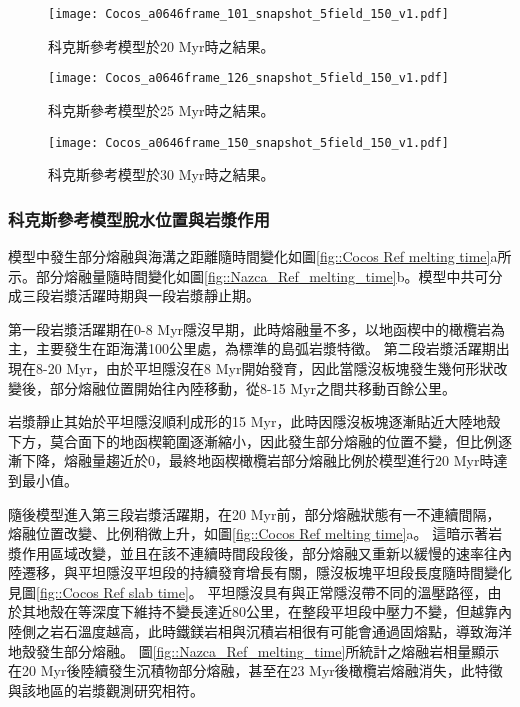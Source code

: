 \begin{figure*}[htp]
    \centering
    \texttt{[image: Cocos\_a0646frame\_101\_snapshot\_5field\_150\_v1.pdf]}
    \caption[科克斯參考模型於20 Myr時之結果]{科克斯參考模型於20 Myr時之結果。}
    \label{fig::Ref Cocos 101}
\end{figure*}

\begin{figure*}[htp]
    \centering
    \texttt{[image: Cocos\_a0646frame\_126\_snapshot\_5field\_150\_v1.pdf]}
    \caption[科克斯參考模型於25 Myr時之結果]{科克斯參考模型於25 Myr時之結果。}
    \label{fig::Ref Cocos 126}
\end{figure*}

\begin{figure*}[htp]
    \centering
    \texttt{[image: Cocos\_a0646frame\_150\_snapshot\_5field\_150\_v1.pdf]}
    \caption[科克斯參考模型於30 Myr時之結果]{科克斯參考模型於30 Myr時之結果。}
    \label{fig::Ref Cocos 150}
\end{figure*}

\newpage
\subsubsection{科克斯參考模型脫水位置與岩漿作用}
模型中發生部分熔融與海溝之距離隨時間變化如圖\ref{fig::Cocos Ref melting time}a所示。部分熔融量隨時間變化如圖\ref{fig::Nazca_Ref_melting_time}b。模型中共可分成三段岩漿活躍時期與一段岩漿靜止期。

第一段岩漿活躍期在0-8 Myr隱沒早期，此時熔融量不多，以地函楔中的橄欖岩為主，主要發生在距海溝100公里處，為標準的島弧岩漿特徵。
第二段岩漿活躍期出現在8-20 Myr，由於平坦隱沒在8 Myr開始發育，因此當隱沒板塊發生幾何形狀改變後，部分熔融位置開始往內陸移動，從8-15 Myr之間共移動百餘公里。

岩漿靜止其始於平坦隱沒順利成形的15 Myr，此時因隱沒板塊逐漸貼近大陸地殼下方，莫合面下的地函楔範圍逐漸縮小，因此發生部分熔融的位置不變，但比例逐漸下降，熔融量趨近於0，最終地函楔橄欖岩部分熔融比例於模型進行20 Myr時達到最小值。

隨後模型進入第三段岩漿活躍期，在20 Myr前，部分熔融狀態有一不連續間隔，熔融位置改變、比例稍微上升，如圖\ref{fig::Cocos Ref melting time}a。
這暗示著岩漿作用區域改變，並且在該不連續時間段段後，部分熔融又重新以緩慢的速率往內陸遷移，與平坦隱沒平坦段的持續發育增長有關，隱沒板塊平坦段長度隨時間變化見圖\ref{fig::Cocos Ref slab time}。
平坦隱沒具有與正常隱沒帶不同的溫壓路徑，由於其地殼在等深度下維持不變長達近80公里，在整段平坦段中壓力不變，但越靠內陸側之岩石溫度越高，此時鐵鎂岩相與沉積岩相很有可能會通過固熔點，導致海洋地殼發生部分熔融。
圖\ref{fig::Nazca_Ref_melting_time}所統計之熔融岩相量顯示在20 Myr後陸續發生沉積物部分熔融，甚至在23 Myr後橄欖岩熔融消失，此特徵與該地區的岩漿觀測研究相符。

